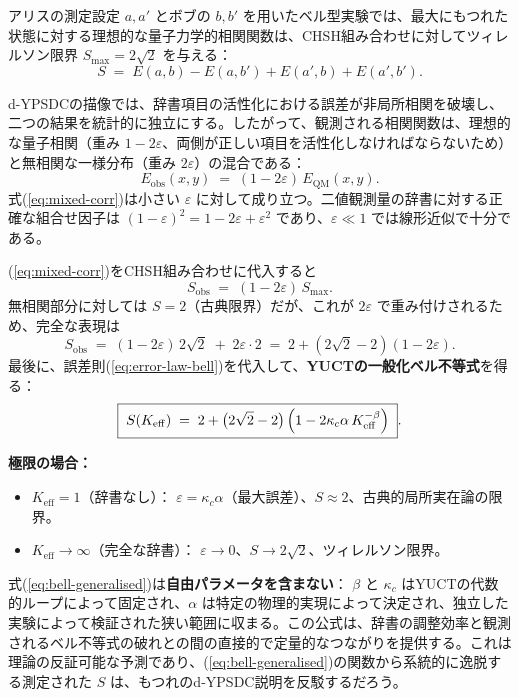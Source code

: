 \documentclass[12pt,a4paper]{article}
\theoremstyle{definition}
\theoremstyle{remark}
\begin{document}
	アリスの測定設定 $a,a'$ とボブの $b,b'$ を用いたベル型実験では、最大にもつれた状態に対する理想的な量子力学的相関関数は、CHSH組み合わせに対してツィレルソン限界 $S_{\max}=2\sqrt{2}$ を与える：
	\[
	S \;=\; E(a,b)-E(a,b')+E(a',b)+E(a',b').
	\]
	
	d-YPSDCの描像では、辞書項目の活性化における誤差が非局所相関を破壊し、二つの結果を統計的に独立にする。したがって、観測される相関関数は、理想的な量子相関（重み $1-2\varepsilon$、両側が正しい項目を活性化しなければならないため）と無相関な一様分布（重み $2\varepsilon$）の混合である：
	\begin{equation}
		E_{\mathrm{obs}}(x,y) \;=\; (1-2\varepsilon)\,E_{\mathrm{QM}}(x,y).
		\label{eq:mixed-corr}
	\end{equation}
	式(\ref{eq:mixed-corr})は小さい $\varepsilon$ に対して成り立つ。二値観測量の辞書に対する正確な組合せ因子は $(1-\varepsilon)^2 = 1-2\varepsilon + \varepsilon^2$ であり、$\varepsilon\ll1$ では線形近似で十分である。
	
	(\ref{eq:mixed-corr})をCHSH組み合わせに代入すると
	\[
	S_{\mathrm{obs}} \;=\; (1-2\varepsilon)\,S_{\max}.
	\]
	無相関部分に対しては $S=2$（古典限界）だが、これが $2\varepsilon$ で重み付けされるため、完全な表現は
	\begin{equation}
		S_{\mathrm{obs}} \;=\; (1-2\varepsilon)\,2\sqrt{2} \;+\; 2\varepsilon\cdot 2
		\;=\; 2 + (2\sqrt{2}-2)(1-2\varepsilon).
		\label{eq:Sobs-intermediate}
	\end{equation}
	最後に、誤差則(\ref{eq:error-law-bell})を代入して、\textbf{YUCTの一般化ベル不等式}を得る：
	\begin{equation}
		\boxed{\;
			S(K_{\mathrm{eff}}) \;=\; 2 + \bigl(2\sqrt{2}-2\bigr)\,
			\Bigl(1 - 2\kappa_c\alpha\,K_{\mathrm{eff}}^{-\beta}\Bigr)
			\;}.
		\label{eq:bell-generalised}
	\end{equation}
	
	\noindent
	\textbf{極限の場合：}
	\begin{itemize}
		\item $K_{\mathrm{eff}}=1$（辞書なし）： $\varepsilon = \kappa_c\alpha$（最大誤差）、$S \approx 2$、古典的局所実在論の限界。
		\item $K_{\mathrm{eff}}\to\infty$（完全な辞書）： $\varepsilon\to0$、$S\to 2\sqrt{2}$、ツィレルソン限界。
	\end{itemize}
	
	式(\ref{eq:bell-generalised})は\textbf{自由パラメータを含まない}： $\beta$ と $\kappa_c$ はYUCTの代数的ループによって固定され、$\alpha$ は特定の物理的実現によって決定され、独立した実験によって検証された狭い範囲に収まる。この公式は、辞書の調整効率と観測されるベル不等式の破れとの間の直接的で定量的なつながりを提供する。これは理論の反証可能な予測であり、(\ref{eq:bell-generalised})の関数から系統的に逸脱する測定された $S$ は、もつれのd-YPSDC説明を反駁するだろう。
	
\end{document}
